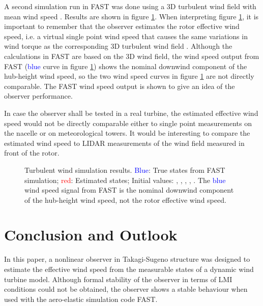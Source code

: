 \documentclass[a4paper]{article}
\begin{document}
A second simulation run in FAST was done using a 3D turbulent wind field with mean wind speed . Results are shown in figure
\ref{Figs_obs_FAST_turb}. When interpreting figure \ref{Figs_obs_FAST_turb}, it is important to remember that the observer estimates the rotor effective wind speed, i.e. a virtual single point wind speed that causes the same variations in wind torque as the corresponding 3D turbulent wind field \cite{DOWECreport}. Although the calculations in FAST are based on the 3D wind field, the wind speed output from FAST (\textcolor{blue}{blue} curve in figure \ref{Figs_obs_FAST_turb}) shows the nominal downwind component of the hub-height wind speed, so the two wind speed curves in figure \ref{Figs_obs_FAST_turb} are not directly comparable. The FAST wind speed output is shown to give an idea of the observer performance.

In case the observer shall be tested in a real turbine, the estimated effective wind speed would not be directly comparable either to single point measurements on the nacelle or on meteorological towers. It would be interesting to compare the estimated wind speed to LIDAR measurements of the wind field measured in front of the rotor.


\begin{figure}[htbp!]
\centerline{}
\vfil
{}
\hfil
{}
\hfil
{}
\caption{Turbulent wind simulation results. \textcolor{blue}{Blue}: True states from FAST simulation; \textcolor{red}{red}: Estimated states; Initial values:
			, , ,
			,
			. The \textcolor{blue}{blue} wind speed signal from FAST is the nominal downwind component of the hub-height wind speed, not the rotor effective wind speed.}
\label{Figs_obs_FAST_turb}
\end{figure}



\section{\label{Sec_Conclusion}Conclusion and Outlook}

In this paper, a nonlinear observer in Takagi-Sugeno structure was designed to estimate the effective wind speed from the measurable states of a dynamic wind turbine model. Although formal stability of the observer in terms of LMI conditions could not be obtained, the observer shows a stable behaviour when used with the aero-elastic simulation code FAST.
\end{document}
